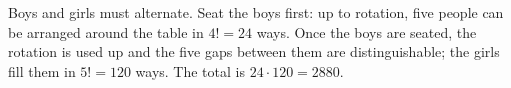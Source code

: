 Boys and girls must alternate. Seat the boys first: up to rotation, five people can be arranged around the table in $4!=24$ ways. Once the boys are seated, the rotation is used up and the five gaps between them are distinguishable; the girls fill them in $5!=120$ ways. The total is $24\cdot120=\boxed{2880}$.
